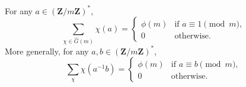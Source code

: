 For any $a \in (\mathbf{Z}/m\mathbf{Z})^*$,
$$
\sum_{\chi \in \hat{G}(m)} \chi(a) = \begin{cases} \phi(m) & \text{if } a \equiv 1 \pmod{m}, \\ 0 & \text{otherwise}. \end{cases}
$$
More generally, for any $a, b \in (\mathbf{Z}/m\mathbf{Z})^*$,
$$
\sum_{\chi} \chi(a^{-1}b) = \begin{cases} \phi(m) & \text{if } a \equiv b \pmod{m}, \\ 0 & \text{otherwise}. \end{cases}
$$
